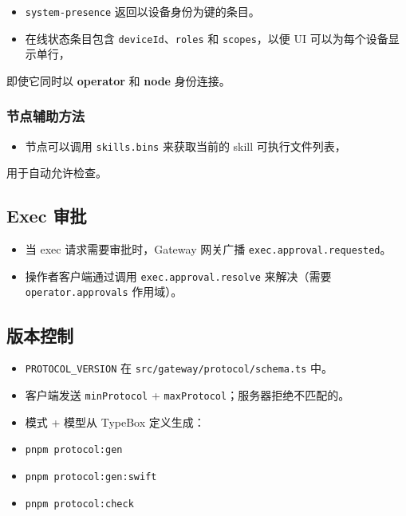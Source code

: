 \begin{itemize}
  \item \texttt{system-presence} 返回以设备身份为键的条目。
  \item 在线状态条目包含 \texttt{deviceId}、\texttt{roles} 和 \texttt{scopes}，以便 UI 可以为每个设备显示单行，
\end{itemize}

即使它同时以 \textbf{operator} 和 \textbf{node} 身份连接。

\subsubsection{节点辅助方法}


\begin{itemize}
  \item 节点可以调用 \texttt{skills.bins} 来获取当前的 skill 可执行文件列表，
\end{itemize}

用于自动允许检查。

\subsection{Exec 审批}


\begin{itemize}
  \item 当 exec 请求需要审批时，Gateway 网关广播 \texttt{exec.approval.requested}。
  \item 操作者客户端通过调用 \texttt{exec.approval.resolve} 来解决（需要 \texttt{operator.approvals} 作用域）。
\end{itemize}


\subsection{版本控制}


\begin{itemize}
  \item \texttt{PROTOCOL\_VERSION} 在 \texttt{src/gateway/protocol/schema.ts} 中。
  \item 客户端发送 \texttt{minProtocol} + \texttt{maxProtocol}；服务器拒绝不匹配的。
  \item 模式 + 模型从 TypeBox 定义生成：
  \item \texttt{pnpm protocol:gen}
  \item \texttt{pnpm protocol:gen:swift}
  \item \texttt{pnpm protocol:check}
\end{itemize}


